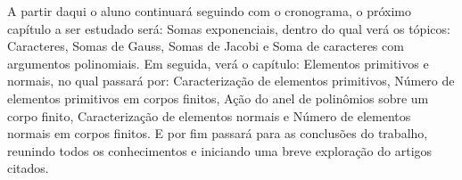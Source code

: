 \documentclass[12pt,twoside]{article}
\begin{document}
    A partir daqui o aluno continuará seguindo com o cronograma, o próximo capítulo a ser estudado será: Somas exponenciais,
    dentro do qual verá os tópicos: Caracteres, Somas de Gauss, Somas de Jacobi e Soma de caracteres com argumentos
    polinomiais. Em seguida, verá o capítulo: Elementos primitivos e normais, no qual passará por: Caracterização de
    elementos primitivos, Número de elementos primitivos em corpos finitos, Ação do anel de polinômios sobre um corpo
    finito, Caracterização de elementos normais e Número de elementos normais em corpos finitos. E por fim passará para
    as conclusões do trabalho, reunindo todos os conhecimentos e iniciando uma breve exploração do artigos citados. \\
    

  \thispagestyle{empty} %
\end{document}
